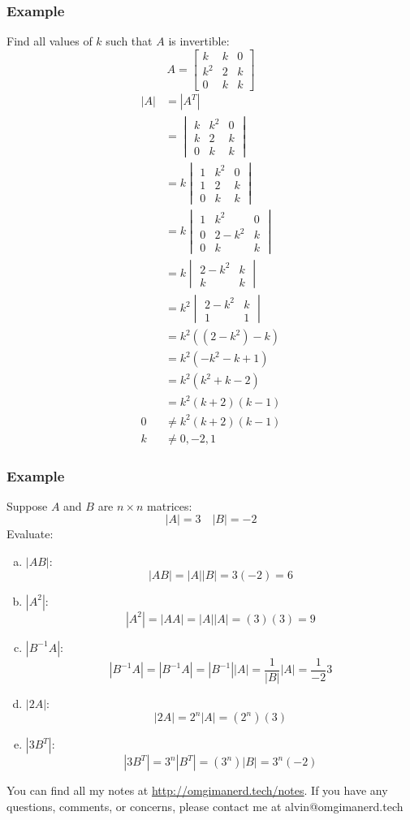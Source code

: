\documentclass{math}
\begin{document}
\subsubsection*{Example}
Find all values of \( k \) such that \( A \) is invertible:
\[ A = \begin{bmatrix}k & k & 0 \\ k^2 & 2 & k \\ 0 & k & k\end{bmatrix} \]
\begin{align*}
  |A| &= |A^T| \\
  &= \begin{vmatrix}
    k & k^2 & 0 \\
    k & 2 & k \\
    0 & k & k
  \end{vmatrix} \\
  &= k\begin{vmatrix}
    1 & k^2 & 0 \\
    1 & 2 & k \\
    0 & k & k
  \end{vmatrix} \\
  &= k\begin{vmatrix}
    1 & k^2 & 0 \\
    0 & 2-k^2 & k \\
    0 & k & k
  \end{vmatrix} \\
  &= k\begin{vmatrix}
    2-k^2 & k \\
    k & k
  \end{vmatrix} \\
  &= k^2\begin{vmatrix}
    2-k^2 & k \\
    1 & 1
  \end{vmatrix} \\
  &= k^2((2-k^2)-k) \\
  &= k^2(-k^2-k+1) \\
  &= k^2(k^2+k-2) \\
  &= k^2(k+2)(k-1) \\
  0 &\ne k^2(k+2)(k-1) \\
  k &\ne 0,-2,1
\end{align*}

\subsubsection*{Example}
Suppose \( A \) and \( B \) are \( n\times n \) matrices:
\[ |A| = 3 \quad |B| = -2\]
Evaluate:
\begin{enumerate}[(a)]
  \item \( |AB| \):
  \[ |AB| = |A||B| = 3(-2) = 6 \]
  \item \( |A^2| \):
  \[ |A^2| = |AA| = |A||A| = (3)(3) = 9 \]
  \item \( |B^{-1}A| \):
  \[ |B^{-1}A| = |B^{-1}A| = |B^{-1}||A| = \frac{1}{|B|}|A| = \frac{1}{-2}3 \]
  \item \( |2A| \):
  \[ |2A| = 2^n|A| = (2^n)(3) \]
  \item \( |3B^T| \):
  \[ |3B^T| = 3^n|B^T| = (3^n)|B| = 3^n(-2) \]
\end{enumerate}

\begin{center}
  You can find all my notes at \url{http://omgimanerd.tech/notes}. If you have
  any questions, comments, or concerns, please contact me at
  alvin@omgimanerd.tech
\end{center}
\end{document}
